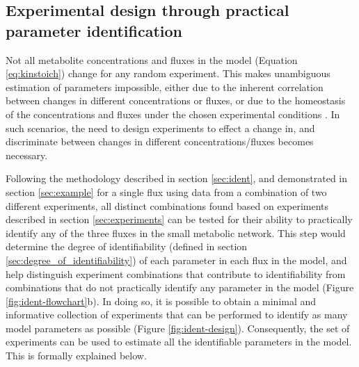 \documentclass[10pt]{article}
\begin{document}
	\subsection{Experimental design through practical parameter identification}\label{sec:experimental_design}		
	Not all metabolite concentrations and fluxes in the model (Equation \ref{eq:kinstoich}) change for any random experiment. This makes unambiguous estimation of parameters impossible, either due to the inherent correlation between changes in different concentrations or fluxes, or due to the homeostasis of the concentrations and fluxes under the chosen experimental conditions \parencite{Heijnen2013}. In such scenarios, the need to design experiments to effect a change in, and discriminate between changes in different concentrations/fluxes becomes necessary. 
		
	Following the methodology described in section \ref{sec:ident}, and demonstrated in section \ref{sec:example} for a single flux using data from a combination of two different experiments, all distinct combinations found based on experiments described in section \ref{sec:experiments} can be tested for their ability to practically identify any of the three fluxes in the small metabolic network. This step would determine the degree of identifiability (defined in section \ref{sec:degree_of_identifiability}) of each parameter in each flux in the model, and help distinguish experiment combinations that contribute to identifiability from combinations that do not practically identify any parameter in the model (Figure \ref{fig:ident-flowchart}b). In doing so, it is possible to obtain a minimal and informative collection of experiments that can be performed to identify as many model parameters as possible (Figure \ref{fig:ident-design}). Consequently, the set of experiments can be used to estimate all the identifiable parameters in the model. This is formally explained below.
	
\end{document}
